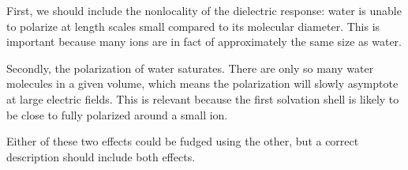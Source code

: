 \documentclass[letterpaper,twocolumn,amsmath,amssymb,prb]{revtex4-1}
\begin{document}
First, we should include the nonlocality of the dielectric response:
water is unable to polarize at length scales small compared to its
molecular diameter.  This is important because many ions are in fact
of approximately the same size as water.

Secondly, the polarization of water saturates.  There are only so many
water molecules in a given volume, which means the polarization will
slowly asymptote at large electric fields.  This is relevant because
the  first solvation shell is likely to be close to fully polarized
around a small ion.

Either of these two  effects could be fudged using the other, but a
correct description should include both effects.

\end{document}
